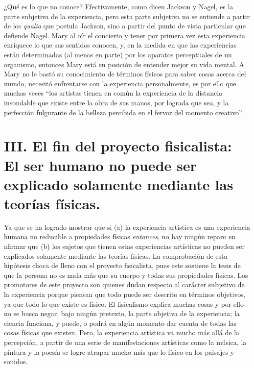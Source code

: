 \documentclass[]{book}
\begin{document}
¿Qué es lo que no conoce? Efectivamente, como dicen Jackson y Nagel, es
la parte subjetiva de la experiencia, pero esta parte subjetiva no se
entiende a partir de los \emph{qualia} que postula Jackson, sino a
partir del punto de vista particular que defiende Nagel. Mary al oír el
concierto y tener por primera vez esta experiencia enriquece lo que sus
sentidos conocen, y, en la medida en que las experiencias están
determinadas (al menos en parte) por los aparatos perceptuales de un
organismo, entonces Mary está en posición de entender mejor su vida
mental. A Mary no le bastó su conocimiento de términos físicos para
saber cosas acerca del mundo, necesitó enfrentarse con la experiencia
personalmente, es por ello que muchas veces ``los artistas tienen en
común la experiencia de la distancia insondable que existe entre la obra
de sus manos, por lograda que sea, y la perfección fulgurante de la
belleza percibida en el fervor del momento creativo''.

\section*{III. El fin del proyecto
  fisicalista: El ser humano no puede ser explicado solamente mediante
  las teorías físicas.}


Ya que se ha logrado mostrar que si (a) la experiencia artística es una
experiencia humana no reducible a propiedades físicas \emph{entonces},
no hay ningún reparo en afirmar que (b) los sujetos que tienen estas
experiencias artísticas no pueden ser explicados solamente mediante las
teorías físicas. La comprobación de esta hipótesis choca de lleno con el
proyecto fisicalista, pues este sostiene la tesis de que la persona no
es nada más que su cuerpo y todas sus propiedades físicas. Los
promotores de este proyecto son quienes dudan respecto al carácter
subjetivo de la experiencia porque piensan que todo puede ser descrito
en términos objetivos, ya que todo lo que existe es físico. El
fisicalismo explica muchas cosas y por ello no se busca negar, bajo
ningún pretexto, la parte objetiva de la experiencia; la ciencia
funciona, y puede, o podrá en algún momento dar cuenta de todas las
cosas físicas que existen. Pero, la experiencia artística va mucho más
allá de la percepción, a partir de una serie de manifestaciones
artísticas como la música, la pintura y la poesía se logre atrapar mucho
más que lo físico en los paisajes y sonidos.
\end{document}

